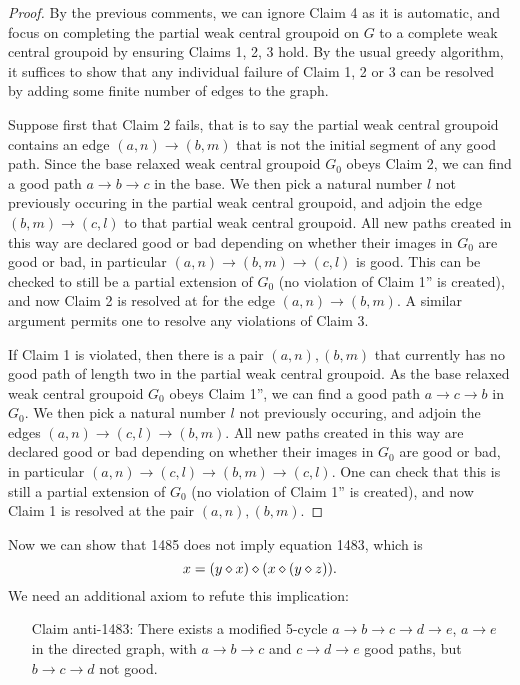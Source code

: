 \begin{proof}  By the previous comments, we can ignore Claim 4 as it is automatic, and focus on completing the partial weak central groupoid on $G$ to a complete weak central groupoid by ensuring Claims 1, 2, 3 hold.  By the usual greedy algorithm, it suffices to show that any individual failure of Claim 1, 2 or 3 can be resolved by adding some finite number of edges to the graph.

  Suppose first that Claim 2 fails, that is to say the partial weak central groupoid contains an edge $(a,n) \to (b,m)$ that is not the initial segment of any good path.  Since the base relaxed weak central groupoid $G_0$ obeys Claim 2, we can find a good path $a \to b \to c$ in the base.  We then pick a natural number $l$ not previously occuring in the partial weak central groupoid, and adjoin the edge $(b,m) \to (c,l)$ to that partial weak central groupoid.  All new paths created in this way are declared good or bad depending on whether their images in $G_0$ are good or bad, in particular $(a,n) \to (b,m) \to (c,l)$ is good.  This can be checked to still be a partial extension of $G_0$ (no violation of Claim 1'' is created), and now Claim 2 is resolved at for the edge $(a,n) \to (b,m)$.  A similar argument permits one to resolve any violations of Claim 3.

If Claim 1 is violated, then there is a pair $(a,n), (b,m)$ that currently has no good path of length two in the partial weak central groupoid.  As the base relaxed weak central groupoid $G_0$ obeys Claim 1'', we can find a good path $a \to c \to b$ in $G_0$.  We then pick a natural number $l$ not previously occuring, and adjoin the edges $(a,n) \to (c,l) \to (b,m)$. All new paths created in this way are declared good or bad depending on whether their images in $G_0$ are good or bad, in particular $(a,n) \to (c,l) \to (b,m) \to (c,l)$.  One can check that this is still a partial extension of $G_0$ (no violation of Claim 1'' is created), and now Claim 1 is resolved at the pair $(a,n), (b,m)$.
\end{proof}

Now we can show that 1485 does not imply equation 1483, which is
\begin{equation}\label{1483}
  x = (y \diamond x) \diamond (x \diamond (y \diamond z)).
\end{equation}
We need an additional axiom to refute this implication:
\begin{itemize}
\item[Claim anti-1483:] There exists a modified 5-cycle $a \to b \to c \to d \to e$, $a \to e$ in the directed graph, with $a \to b \to c$ and $c \to d \to e$ good paths, but $b \to c \to d$ not good.
\end{itemize}

